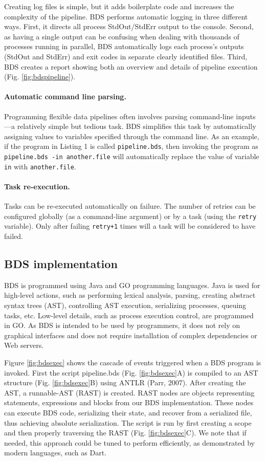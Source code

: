 Creating log files is simple, but it adds boilerplate code and increases the complexity of the pipeline. BDS performs automatic logging in three different ways. First, it directs all process StdOut/StdErr output to the console. Second, as having a single output can be confusing when dealing with thousands of processes running in parallel, BDS automatically logs each process’s outputs (StdOut and StdErr) and exit codes in separate clearly identified files. Third, BDS creates a report showing both an overview and details of pipeline execution (Fig. \ref{fig:bdspipeline}).

\paragraph{Automatic command line parsing.} Programming flexible data pipelines often involves parsing command-line inputs—a relatively simple but tedious task. BDS simplifies this task by automatically assigning values to variables specified through the command line. As an example, if the program in Listing 1 is called \texttt{pipeline.bds}, then invoking the program as \texttt{pipeline.bds -in another.file} will automatically replace the value of variable \texttt{in} with \texttt{another.file}.

\paragraph{Task re-execution.} Tasks can be re-executed automatically on failure. The number of retries can be configured globally (as a command-line argument) or by a task (using the \texttt{retry} variable). Only after failing \texttt{retry+1} times will a task will be considered to have failed.

\subsection{BDS implementation}

BDS is programmed using Java and GO programming languages. Java is used for high-level actions, such as performing lexical analysis, parsing, creating abstract syntax trees (AST), controlling AST execution, serializing processes, queuing tasks, etc. Low-level details, such as process execution control, are programmed in GO. As BDS is intended to be used by programmers, it does not rely on graphical interfaces and does not require installation of complex dependencies or Web servers.

Figure \ref{fig:bdsexec} shows the cascade of events triggered when a BDS program is invoked. First the script pipeline.bds (Fig. \ref{fig:bdsexec}A) is compiled to an AST structure (Fig. \ref{fig:bdsexec}B) using ANTLR (Parr, 2007). After creating the AST, a runnable-AST (RAST) is created. RAST nodes are objects representing statements, expressions and blocks from our BDS implementation. These nodes can execute BDS code, serializing their state, and recover from a serialized file, thus achieving absolute serialization. The script is run by first creating a scope and then properly traversing the RAST (Fig. \ref{fig:bdsexec}C). We note that if needed, this approach could be tuned to perform efficiently, as demonstrated by modern languages, such as Dart.

